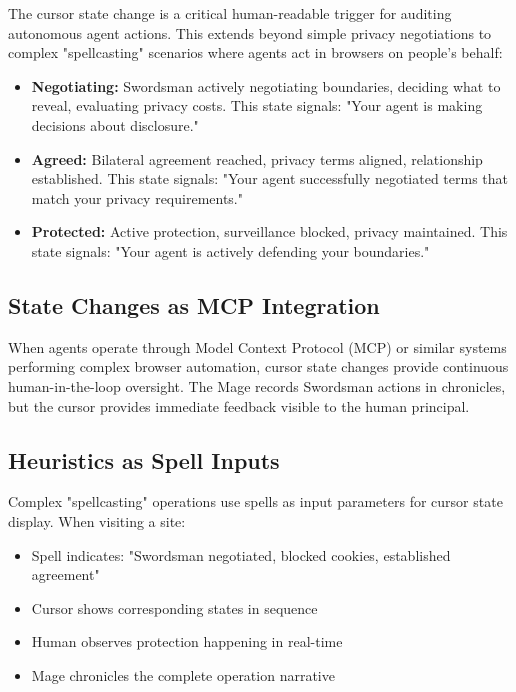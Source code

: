 \documentclass[11pt,a4paper]{article}
\theoremstyle{definition}
\begin{document}
The cursor state change is a critical human-readable trigger for auditing autonomous agent actions. This extends beyond simple privacy negotiations to complex "spellcasting" scenarios where agents act in browsers on people's behalf:

\begin{itemize}
    \item \textbf{Negotiating:} Swordsman actively negotiating boundaries, deciding what to reveal, evaluating privacy costs. This state signals: "Your agent is making decisions about disclosure."
    \item \textbf{Agreed:} Bilateral agreement reached, privacy terms aligned, relationship established. This state signals: "Your agent successfully negotiated terms that match your privacy requirements."
    \item \textbf{Protected:} Active protection, surveillance blocked, privacy maintained. This state signals: "Your agent is actively defending your boundaries."
\end{itemize}

\subsection{State Changes as MCP Integration}

When agents operate through Model Context Protocol (MCP) or similar systems performing complex browser automation, cursor state changes provide continuous human-in-the-loop oversight. The Mage records Swordsman actions in chronicles, but the cursor provides immediate feedback visible to the human principal.

\subsection{Heuristics as Spell Inputs}

Complex "spellcasting" operations use spells as input parameters for cursor state display. When visiting a site:

\begin{itemize}
    \item Spell indicates: "Swordsman negotiated, blocked cookies, established agreement"
    \item Cursor shows corresponding states in sequence
    \item Human observes protection happening in real-time
    \item Mage chronicles the complete operation narrative
\end{itemize}
\end{document}
